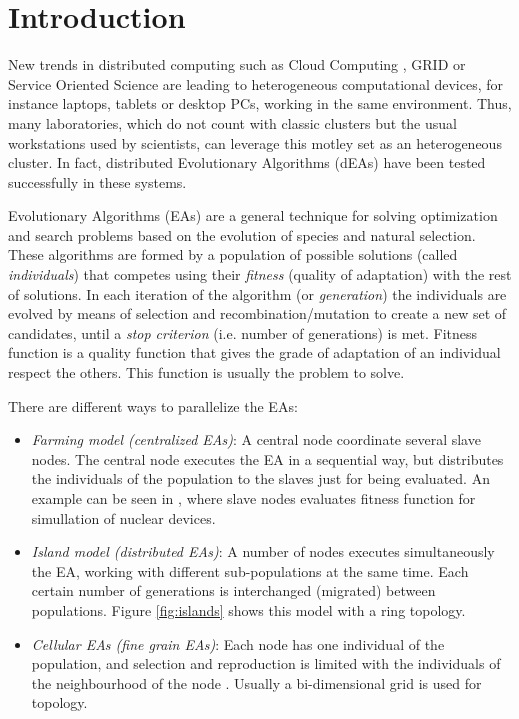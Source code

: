\section{Introduction}
\label{sec:intro}

New trends in distributed computing such as Cloud Computing \cite{CLOUD}, GRID
\cite{OPENSCIENCEGRID} or Service Oriented Science \cite{GLOBUS} are
leading to heterogeneous computational devices,  for instance laptops,
tablets or desktop PCs, working in the same
environment. Thus, many laboratories, which do not count with classic
clusters but the usual workstations used by scientists, can leverage
this motley set as an heterogeneous cluster. In fact, distributed Evolutionary
Algorithms (dEAs) \cite{MULTIKULTI} have been tested successfully in these
systems.  %

Evolutionary Algorithms (EAs) are a general technique for solving optimization and search problems based on the evolution of species and natural selection. These algorithms are formed by a population of possible solutions (called {\em individuals}) that competes using their {\em fitness} (quality of adaptation) with the rest of solutions. In each iteration of the algorithm (or {\em generation}) the individuals are evolved by means of selection and recombination/mutation to create a new set of candidates, until a {\em stop criterion} (i.e. number of generations) is met. Fitness function is a quality function that gives the grade of adaptation of an individual respect the others. This function is usually the problem to solve. 

There are different ways to parallelize the EAs:

\begin{itemize}
\item {\em Farming model (centralized EAs)}: A central node coordinate several slave nodes. The central node executes the EA in a sequential way, but distributes the individuals of the population to the slaves just for being evaluated. An example can be seen in \cite{NUCLEAR}, where slave nodes evaluates fitness function for simullation of nuclear devices.
\item {\em Island model (distributed EAs)}: A number of nodes executes simultaneously the EA, working with different sub-populations at the same time. Each certain number of generations is interchanged (migrated) between populations. Figure \ref{fig:islands} shows this model with a ring topology.
\item {\em Cellular EAs (fine grain EAs)}: Each node has one individual of the population, and selection and reproduction is limited with the individuals of the neighbourhood of the node \cite{CELLULAR}. Usually a bi-dimensional grid is used for topology. 
\end{itemize}

